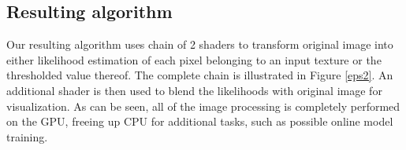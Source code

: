 \documentclass[10pt,twocolumn, a4paper]{article}
\begin{document}
\subsection{Resulting algorithm}
\label{ra}
Our resulting algorithm uses chain of 2 shaders to transform original image into either likelihood estimation of each pixel belonging to an input texture or the thresholded value thereof.  The complete chain is illustrated in Figure \ref{eps2}. An additional shader is then used to blend the likelihoods with original image for visualization. As can be seen, all of the image processing is completely performed on the GPU, freeing up CPU for additional tasks, such as possible online model training.

\begin{figure}[t]
    \centering
\begin{minipage}{.25\textwidth}
	 \end{minipage}
	 \begin{minipage}{.2\textwidth}
 \\
	 \end{minipage}


\end{figure}
\end{document}
